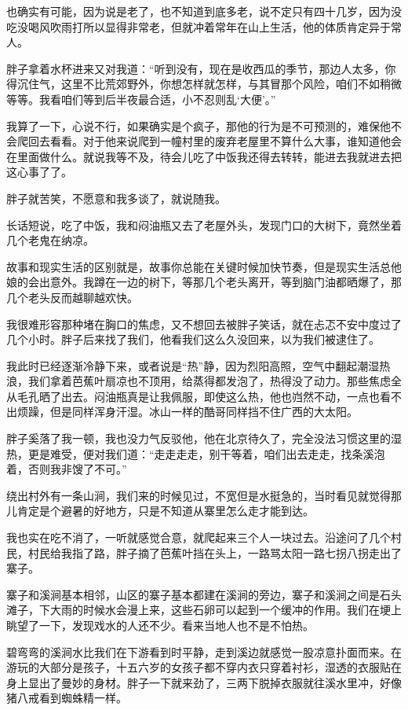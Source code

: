 也确实有可能，因为说是老了，也不知道到底多老，说不定只有四十几岁，因为没吃没喝风吹雨打所以显得非常老，但就冲着常年在山上生活，他的体质肯定异于常人。

胖子拿着水杯进来又对我道：“听到没有，现在是收西瓜的季节，那边人太多，你得沉住气，这里不比荒郊野外，你想怎样就怎样，与其冒那个风险，咱们不如稍微等等。我看咱们等到后半夜最合适，小不忍则乱‘大便’。”

我算了一下，心说不行，如果确实是个疯子，那他的行为是不可预测的，难保他不会爬回去看看。对于他来说爬到一幢村里的废弃老屋里不算什么大事，谁知道他会在里面做什么。就说我等不及，待会儿吃了中饭我还得去转转，能进去我就进去把这心事了了。

胖子就苦笑，不愿意和我多谈了，就说随我。

长话短说，吃了中饭，我和闷油瓶又去了老屋外头，发现门口的大树下，竟然坐着几个老鬼在纳凉。

故事和现实生活的区别就是，故事你总能在关键时候加快节奏，但是现实生活总他娘的会出意外。我蹲在一边的树下，等那几个老头离开，等到脑门油都晒爆了，那几个老头反而越聊越欢快。

我很难形容那种堵在胸口的焦虑，又不想回去被胖子笑话，就在忐忑不安中度过了几个小时。胖子后来找了我们，他看我们这么久没回来，以为我们被逮住了。

我此时已经逐渐冷静下来，或者说是“热”静，因为烈阳高照，空气中翻起潮湿热浪，我们拿着芭蕉叶扇凉也不顶用，给蒸得都发泡了，热得没了动力。那些焦虑全从毛孔晒了出去。闷油瓶真是让我佩服，即使这么热，他也岿然不动，一点也看不出烦躁，但是同样浑身汗湿。冰山一样的酷哥同样挡不住广西的大太阳。

胖子奚落了我一顿，我也没力气反驳他，他在北京待久了，完全没法习惯这里的湿热，更是难受，便对我们道：“走走走走，别干等着，咱们出去走走，找条溪泡着，否则我非馊了不可。”

绕出村外有一条山涧，我们来的时候见过，不宽但是水挺急的，当时看见就觉得那儿肯定是个避暑的好地方，只是不知道从寨里怎么走才能到达。

我也实在吃不消了，一听就感觉合意，就爬起来三个人一块过去。沿途问了几个村民，村民给我指了路，胖子摘了芭蕉叶挡在头上，一路骂太阳一路七拐八拐走出了寨子。

寨子和溪涧基本相邻，山区的寨子基本都建在溪涧的旁边，寨子和溪涧之间是石头滩子，下大雨的时候水会漫上来，这些石卵可以起到一个缓冲的作用。我们在埂上眺望了一下，发现戏水的人还不少。看来当地人也不是不怕热。

碧弯弯的溪涧水比我们在下游看到时平静，走到溪边就感觉一股凉意扑面而来。在游玩的大部分是孩子，十五六岁的女孩子都不穿内衣只穿着衬衫，湿透的衣服贴在身上显出了曼妙的身材。胖子一下就来劲了，三两下脱掉衣服就往溪水里冲，好像猪八戒看到蜘蛛精一样。

